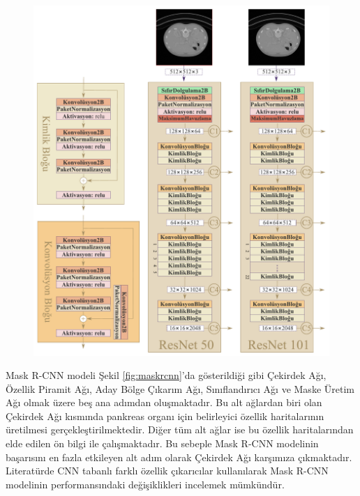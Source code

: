 \begin{figure}[h!]
	\begin{center}
		\vspace{0.4cm}
		{
			\vspace{0.4cm}
			\includegraphics[scale=0.6]{Yapilan-Calismalar/Figures/head_network2.pdf}
		}
	\end{center}
\end{figure} 

Mask R-CNN modeli Şekil \ref{fig:maskrcnn}'da gösterildiği gibi Çekirdek Ağı, Özellik Piramit Ağı, Aday Bölge Çıkarım Ağı, Sınıflandırıcı Ağı ve Maske Üretim Ağı olmak üzere beş ana adımdan oluşmaktadır. Bu alt ağlardan biri olan Çekirdek Ağı kısmında pankreas organı için belirleyici özellik haritalarının üretilmesi gerçekleştirilmektedir. Diğer tüm alt ağlar ise bu özellik haritalarından elde edilen ön bilgi ile çalışmaktadır. Bu sebeple Mask R-CNN modelinin başarısını en fazla etkileyen alt adım olarak Çekirdek Ağı karşımıza çıkmaktadır. Literatürde CNN tabanlı farklı özellik çıkarıcılar kullanılarak Mask R-CNN modelinin performansındaki değişiklikleri incelemek mümkündür.


